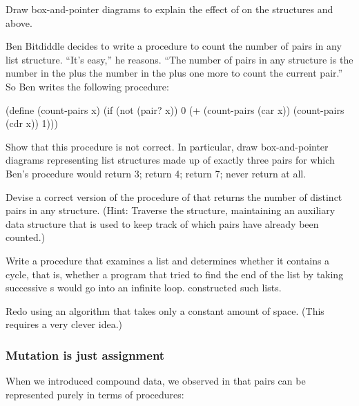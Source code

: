 \begin{exerciseGroup}
\label{Exercise 3.15}
 Draw box-and-pointer diagrams to
explain the effect of  on the structures  and
 above.

\label{Exercise 3.16}
 Ben Bitdiddle decides to write a
procedure to count the number of pairs in any list structure.  ``It's easy,''
he reasons.  ``The number of pairs in any structure is the number in the
 plus the number in the  plus one more to count the current
pair.''  So Ben writes the following procedure:

\begin{codeBlock}
(define (count-pairs x)
  (if (not (pair? x))
      0
      (+ (count-pairs (car x))
         (count-pairs (cdr x))
         1)))
\end{codeBlock}

Show that this procedure is not correct.  In particular, draw box-and-pointer
diagrams representing list structures made up of exactly three pairs for which
Ben's procedure would return 3; return 4; return 7; never return at all.

\label{Exercise 3.17}
 Devise a correct version of the
 procedure of  that returns the number of
distinct pairs in any structure.  (Hint: Traverse the structure, maintaining an
auxiliary data structure that is used to keep track of which pairs have already
been counted.)

\label{Exercise 3.18}
 Write a procedure that examines a
list and determines whether it contains a cycle, that is, whether a program
that tried to find the end of the list by taking successive s would
go into an infinite loop.   constructed such lists.

\label{Exercise 3.19}
 Redo  using an
algorithm that takes only a constant amount of space.  (This requires a very
clever idea.)
\end{exerciseGroup}

\subsubsection*{Mutation is just assignment}

When we introduced compound data, we observed in  that pairs
can be represented purely in terms of procedures:

